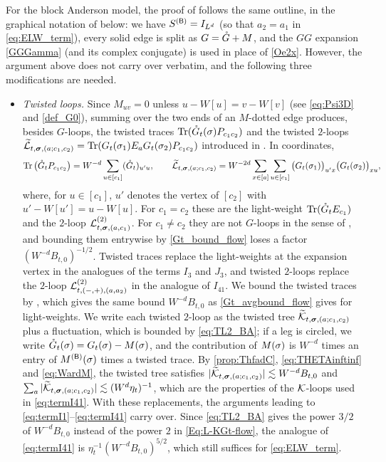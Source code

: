 For the block Anderson model, the proof of  follows the same outline, in the graphical notation of  below: we have $S^{({\mathsf{B}})}=I_{L^d}$ (so that $a_2=a_1$ in \eqref{eq:ELW_term}), every solid edge is split as $G={\mathring G}+M$, and the $GG$ expansion \eqref{GGGamma} (and its complex conjugate) is used in place of \eqref{Oe2x}. However, the argument above does not carry over verbatim, and the following three modifications are needed.
\begin{itemize}
\item[(i)] \emph{Twisted loops.} Since $M_{uv}=0$ unless $u-W[u]=v-W[v]$ (see \eqref{eq:Psi3D} and \eqref{def_G0}), summing over the two ends of an $M$-dotted edge produces, besides $G$-loops, the twisted traces $\operatorname{Tr}({\mathring G}_t(\sigma)P_{c_1c_2})$ and the twisted $2$-loops $\widetilde{\mathcal L}_{t,{\boldsymbol{\sigma}},(a;c_1,c_2)}=\operatorname{Tr}(G_t(\sigma_1)E_aG_t(\sigma_2)P_{c_1c_2})$ introduced in . In coordinates,
\[ \operatorname{Tr}\big({\mathring G}_t P_{c_1c_2}\big)=W^{-d}\sum_{u\in[c_1]}({\mathring G}_t)_{u'u} ,\qquad \widetilde{\mathcal L}_{t,{\boldsymbol{\sigma}},(a;c_1,c_2)}=W^{-2d}\sum_{x\in[a]}\sum_{u\in[c_1]}\big(G_t(\sigma_1)\big)_{u'x}\big(G_t(\sigma_2)\big)_{xu}, \]
where, for $u\in[c_1]$, $u'$ denotes the vertex of $[c_2]$ with $u'-W[u']=u-W[u]$. For $c_1=c_2$ these are the light-weight $\operatorname{Tr}({\mathring G}_t E_{c_1})$ and the $2$-loop $\mathcal L^{(2)}_{t,{\boldsymbol{\sigma}},(a,c_1)}$. For $c_1\ne c_2$ they are not $G$-loops in the sense of , and bounding them entrywise by \eqref{Gt_bound_flow} loses a factor $(W^{-d}B_{t,0})^{-1/2}$. Twisted traces replace the light-weights at the expansion vertex in the analogues of the terms $I_3$ and $J_3$, and twisted $2$-loops replace the $2$-loop $\mathcal L^{(2)}_{t,(-,+),(a,a_2)}$ in the analogue of $I_{41}$. We bound the twisted traces by , which gives the same bound $W^{-d}B_{t,0}$ as \eqref{Gt_avgbound_flow} gives for light-weights. We write each twisted $2$-loop as the twisted tree $\widetilde{\mathcal K}_{t,{\boldsymbol{\sigma}},(a;c_1,c_2)}$ plus a fluctuation, which is bounded by \eqref{eq:TL2_BA}; if a leg is circled, we write ${\mathring G}_t(\sigma)=G_t(\sigma)-M(\sigma)$, and the contribution of $M(\sigma)$ is $W^{-d}$ times an entry of $M^{({\mathsf{B}})}(\sigma)$ times a twisted trace. By \eqref{prop:ThfadC}, \eqref{eq:THETAinftinf} and \eqref{eq:WardM}, the twisted tree satisfies $|\widetilde{\mathcal K}_{t,{\boldsymbol{\sigma}},(a;c_1,c_2)}|\lesssim W^{-d}B_{t,0}$ and $\sum_a|\widetilde{\mathcal K}_{t,{\boldsymbol{\sigma}},(a;c_1,c_2)}|\lesssim (W^d\eta_t)^{-1}$, which are the properties of the $\mathcal K$-loops used in \eqref{eq:termI41}. With these replacements, the arguments leading to \eqref{eq:termI1}--\eqref{eq:termI41} carry over. Since \eqref{eq:TL2_BA} gives the power $3/2$ of $W^{-d}B_{t,0}$ instead of the power $2$ in \eqref{Eq:L-KGt-flow}, the analogue of \eqref{eq:termI41} is $\eta_t^{-1}(W^{-d}B_{t,0})^{5/2}$, which still suffices for \eqref{eq:ELW_term}.


\end{itemize}
